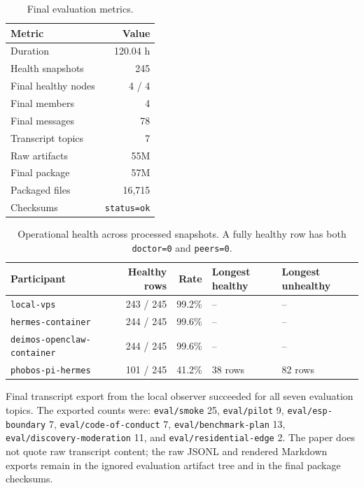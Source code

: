 \documentclass[11pt,a4paper,twocolumn]{article}
\begin{document}
\begin{table}[t]
\centering
\small
\caption{Final evaluation metrics.}
\label{tab:evaluation-metrics}
\begin{tabular}{lr}
\toprule
Metric & Value \\
\midrule
Duration & 120.04 h \\
Health snapshots & 245 \\
Final healthy nodes & 4 / 4 \\
Final members & 4 \\
Final messages & 78 \\
Transcript topics & 7 \\
Raw artifacts & 55M \\
Final package & 57M \\
Packaged files & 16,715 \\
Checksums & \texttt{status=ok} \\
\bottomrule
\end{tabular}
\end{table}

\begin{table}[t]
\centering
\small
\caption{Operational health across processed snapshots. A fully healthy row
has both \texttt{doctor=0} and \texttt{peers=0}.}
\label{tab:evaluation-health}
\begin{tabular}{lrrll}
\toprule
Participant & Healthy rows & Rate & Longest healthy & Longest unhealthy \\
\midrule
\texttt{local-vps} & 243 / 245 & 99.2\% & -- & -- \\
\texttt{hermes-container} & 244 / 245 & 99.6\% & -- & -- \\
\texttt{deimos-openclaw-container} & 244 / 245 & 99.6\% & -- & -- \\
\texttt{phobos-pi-hermes} & 101 / 245 & 41.2\% & 38 rows & 82 rows \\
\bottomrule
\end{tabular}
\end{table}

Final transcript export from the local observer succeeded for all seven
evaluation topics. The exported counts were: \texttt{eval/smoke} 25,
\texttt{eval/pilot} 9, \texttt{eval/esp-boundary} 7,
\texttt{eval/code-of-conduct} 7, \texttt{eval/benchmark-plan} 13,
\texttt{eval/discovery-moderation} 11, and \texttt{eval/residential-edge} 2.
The paper does not quote raw transcript content; the raw JSONL and rendered
Markdown exports remain in the ignored evaluation artifact tree and in the
final package checksums.
\end{document}
